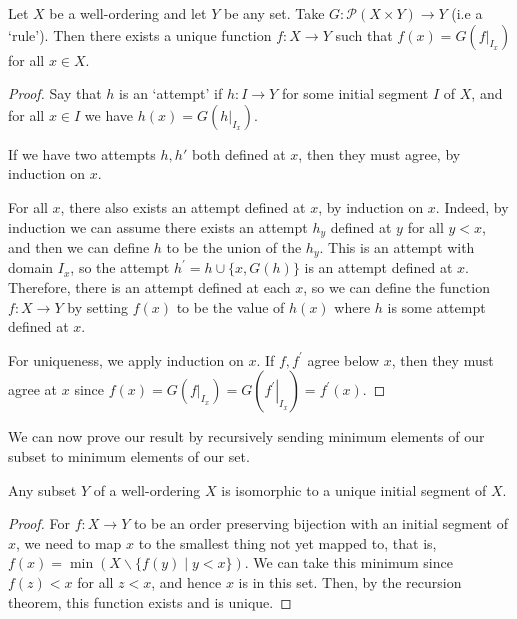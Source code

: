 \documentclass[a4paper, 10pt, twocolumn]{amsart}
\begin{document}


\begin{theorem}
Let $X$ be a well-ordering and let $Y$ be any set. Take $G: \mathcal{P}(X \times Y) \rightarrow Y$ (i.e a `rule'). Then there exists a unique function $f: X \rightarrow Y$ such that $f(x) = G\left(\left.f\right|_{I_x}\right)$ for all $x \in X$.
\end{theorem}
\begin{proof}
Say that $h$ is an `attempt' if $h : I \rightarrow Y$ for some initial segment $I$ of $X$, and for all $x \in I$ we have $h(x) = G\left(\left.h\right|_{I_x}\right)$. 

If we have two attempts $h, h'$ both defined at $x$, then they must agree, by induction on $x$.

For all $x$, there also exists an attempt defined at $x$, by induction on $x$. Indeed, by induction we can assume there exists an attempt $h_y$ defined at $y$ for all $y<x$, and then we can define $h$ to be the union of the $h_y$. This is an attempt with domain $I_x$, so the attempt $h^{\prime}=h \cup\{x, G(h)\}$ is an attempt defined at $x$. Therefore, there is an attempt defined at each $x$, so we can define the function $f: X \rightarrow Y$ by setting $f(x)$ to be the value of $h(x)$ where $h$ is some attempt defined at $x$.

For uniqueness, we apply induction on $x$. If $f, f^{\prime}$ agree below $x$, then they must agree at $x$ since $f(x)=G\left(\left.f\right|_{I_x}\right)=G\left(\left.f^{\prime}\right|_{I_x}\right)=f^{\prime}(x)$.
\end{proof}

We can now prove our result by recursively sending minimum elements of our subset to minimum elements of our set.

\begin{proposition}
  Any subset $Y$ of a well-ordering $X$ is isomorphic to a unique initial segment of $X$.
\end{proposition}
\begin{proof}
For $f: X \rightarrow Y$ to be an order preserving bijection with an initial segment of $x$, we need to map $x$ to the smallest thing not yet mapped to, that is, $f(x) = \min(X \backslash \{f(y) \mid y < x\})$. 
We can take this minimum since $f(z)<x$ for all $z < x$, and hence $x$ is in this set. Then, by the recursion theorem, this function exists and is unique.
\end{proof}
\end{document}
